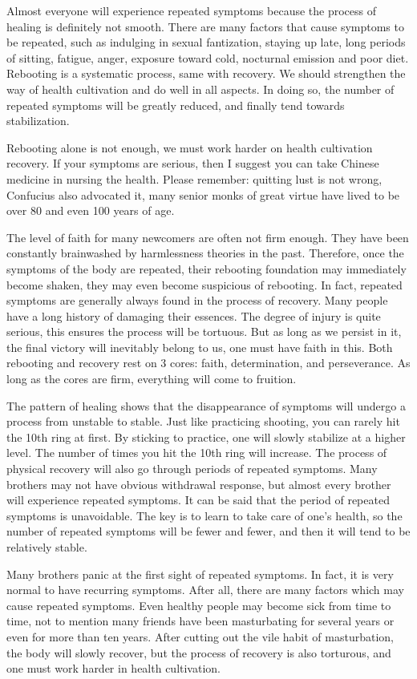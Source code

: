 \documentclass[
]{book}
\begin{document}
Almost everyone will experience repeated symptoms because the process of healing is definitely not smooth. There are many factors that cause symptoms to be repeated, such as indulging in sexual fantization, staying up late, long periods of sitting, fatigue, anger, exposure toward cold, nocturnal emission and poor diet. Rebooting is a systematic process, same with recovery. We should strengthen the way of health cultivation and do well in all aspects. In doing so, the number of repeated symptoms will be greatly reduced, and finally tend towards stabilization.

Rebooting alone is not enough, we must work harder on health cultivation recovery. If your symptoms are serious, then I suggest you can take Chinese medicine in nursing the health. Please remember: quitting lust is not wrong, Confucius also advocated it, many senior monks of great virtue have lived to be over 80 and even 100 years of age.

The level of faith for many newcomers are often not firm enough. They have been constantly brainwashed by harmlessness theories in the past. Therefore, once the symptoms of the body are repeated, their rebooting foundation may immediately become shaken, they may even become suspicious of rebooting. In fact, repeated symptoms are generally always found in the process of recovery. Many people have a long history of damaging their essences. The degree of injury is quite serious, this ensures the process will be tortuous. But as long as we persist in it, the final victory will inevitably belong to us, one must have faith in this. Both rebooting and recovery rest on 3 cores: faith, determination, and perseverance. As long as the cores are firm, everything will come to fruition.

The pattern of healing shows that the disappearance of symptoms will undergo a process from unstable to stable. Just like practicing shooting, you can rarely hit the 10th ring at first. By sticking to practice, one will slowly stabilize at a higher level. The number of times you hit the 10th ring will increase. The process of physical recovery will also go through periods of repeated symptoms. Many brothers may not have obvious withdrawal response, but almost every brother will experience repeated symptoms. It can be said that the period of repeated symptoms is unavoidable. The key is to learn to take care of one's health, so the number of repeated symptoms will be fewer and fewer, and then it will tend to be relatively stable.

Many brothers panic at the first sight of repeated symptoms. In fact, it is very normal to have recurring symptoms. After all, there are many factors which may cause repeated symptoms. Even healthy people may become sick from time to time, not to mention many friends have been masturbating for several years or even for more than ten years. After cutting out the vile habit of masturbation, the body will slowly recover, but the process of recovery is also torturous, and one must work harder in health cultivation.
\end{document}

